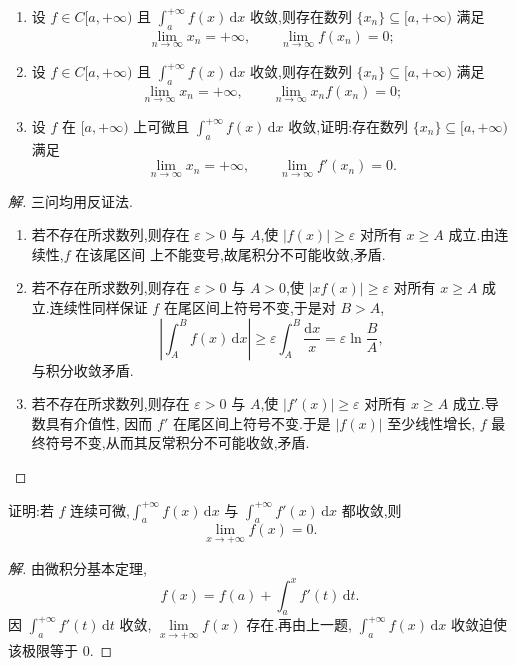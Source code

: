 \documentclass[../../数学分析培优讲义(答案版).tex]{subfiles}
\begin{document}
\begin{example}
\begin{enumerate}[label=(\arabic*)]
    \item 设 $f\in C\lbrack a,+\infty)$ 且 $\displaystyle\int_a^{+\infty}f(x)\,\mathrm{d}x$ 收敛,则存在数列 $\{x_n\}\subseteq\lbrack a,+\infty)$ 满足
    \[
        \lim\limits_{n\to\infty}x_n=+\infty,
        \qquad
        \lim\limits_{n\to\infty}f(x_n)=0;
    \]
    \item 设 $f\in C\lbrack a,+\infty)$ 且 $\displaystyle\int_a^{+\infty}f(x)\,\mathrm{d}x$ 收敛,则存在数列 $\{x_n\}\subseteq\lbrack a,+\infty)$ 满足
    \[
        \lim\limits_{n\to\infty}x_n=+\infty,
        \qquad
        \lim\limits_{n\to\infty}x_nf(x_n)=0;
    \]
    \item 设 $f$ 在 $\lbrack a,+\infty)$ 上可微且 $\displaystyle\int_a^{+\infty}f(x)\,\mathrm{d}x$ 收敛,证明:存在数列 $\{x_n\}\subseteq\lbrack a,+\infty)$ 满足
    \[
        \lim\limits_{n\to\infty}x_n=+\infty,
        \qquad
        \lim\limits_{n\to\infty}f'(x_n)=0.
    \]
\end{enumerate}
\end{example}

\begin{proof}[解]
三问均用反证法.
\begin{enumerate}[label=(\arabic*)]
    \item 若不存在所求数列,则存在 $\varepsilon>0$ 与 $A$,使
    $|f(x)|\geq\varepsilon$ 对所有 $x\geq A$ 成立.由连续性,$f$ 在该尾区间
    上不能变号,故尾积分不可能收敛,矛盾.

    \item 若不存在所求数列,则存在 $\varepsilon>0$ 与 $A>0$,使
    $|xf(x)|\geq\varepsilon$ 对所有 $x\geq A$ 成立.连续性同样保证 $f$
    在尾区间上符号不变,于是对 $B>A$,
    \[
        \left|\int_A^Bf(x)\,\mathrm{d}x\right|
        \geq\varepsilon\int_A^B\dfrac{\mathrm{d}x}{x}
        =\varepsilon\ln\dfrac{B}{A},
    \]
    与积分收敛矛盾.

    \item 若不存在所求数列,则存在 $\varepsilon>0$ 与 $A$,使
    $|f'(x)|\geq\varepsilon$ 对所有 $x\geq A$ 成立.导数具有介值性,
    因而 $f'$ 在尾区间上符号不变.于是 $|f(x)|$ 至少线性增长,
    $f$ 最终符号不变,从而其反常积分不可能收敛,矛盾.
\end{enumerate}
\end{proof}

\begin{example}
证明:若 $f$ 连续可微,$\displaystyle\int_a^{+\infty}f(x)\,\mathrm{d}x$ 与 $\displaystyle\int_a^{+\infty}f'(x)\,\mathrm{d}x$ 都收敛,则
\[
    \lim\limits_{x\to+\infty}f(x)=0.
\]
\end{example}

\begin{proof}[解]
由微积分基本定理,
\[
    f(x)=f(a)+\int_a^xf'(t)\,\mathrm{d}t.
\]
因 $\displaystyle\int_a^{+\infty}f'(t)\,\mathrm{d}t$ 收敛,
$\displaystyle\lim\limits_{x\to+\infty}f(x)$ 存在.再由上一题,
$\displaystyle\int_a^{+\infty}f(x)\,\mathrm{d}x$ 收敛迫使该极限等于 $0$.
\end{proof}
\end{document}
